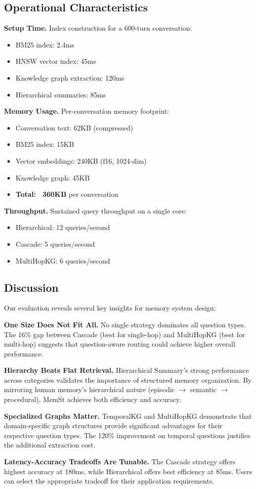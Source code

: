 \subsection{Operational Characteristics}

\textbf{Setup Time.} Index construction for a 600-turn conversation:
\begin{itemize}
    \item BM25 index: 2.4ms
    \item HNSW vector index: 45ms
    \item Knowledge graph extraction: 120ms
    \item Hierarchical summaries: 85ms
\end{itemize}

\textbf{Memory Usage.} Per-conversation memory footprint:
\begin{itemize}
    \item Conversation text: 62KB (compressed)
    \item BM25 index: 15KB
    \item Vector embeddings: 240KB (f16, 1024-dim)
    \item Knowledge graph: 45KB
    \item \textbf{Total: ~360KB} per conversation
\end{itemize}

\textbf{Throughput.} Sustained query throughput on a single core:
\begin{itemize}
    \item Hierarchical: 12 queries/second
    \item Cascade: 5 queries/second
    \item MultiHopKG: 6 queries/second
\end{itemize}

\subsection{Discussion}

Our evaluation reveals several key insights for memory system design:

\textbf{One Size Does Not Fit All.} No single strategy dominates all question types. The 16\% gap between Cascade (best for single-hop) and MultiHopKG (best for multi-hop) suggests that question-aware routing could achieve higher overall performance.

\textbf{Hierarchy Beats Flat Retrieval.} Hierarchical Summary's strong performance across categories validates the importance of structured memory organization. By mirroring human memory's hierarchical nature (episodic $\rightarrow$ semantic $\rightarrow$ procedural), MemSt achieves both efficiency and accuracy.

\textbf{Specialized Graphs Matter.} TemporalKG and MultiHopKG demonstrate that domain-specific graph structures provide significant advantages for their respective question types. The 120\% improvement on temporal questions justifies the additional extraction cost.

\textbf{Latency-Accuracy Tradeoffs Are Tunable.} The Cascade strategy offers highest accuracy at 180ms, while Hierarchical offers best efficiency at 85ms. Users can select the appropriate tradeoff for their application requirements.
